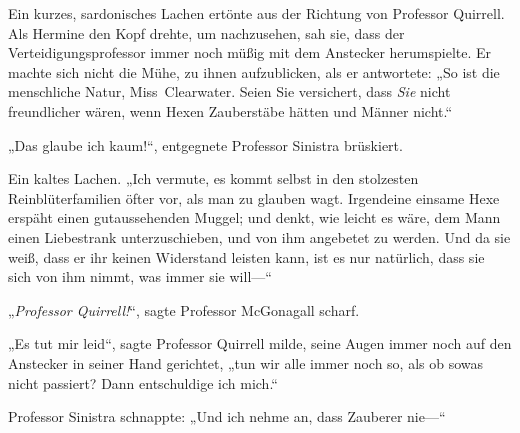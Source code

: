Ein kurzes, sardonisches Lachen ertönte aus der Richtung von Professor Quirrell. Als Hermine den Kopf drehte, um nachzusehen, sah sie, dass der Verteidigungsprofessor immer noch müßig mit dem Anstecker herumspielte. Er machte sich nicht die Mühe, zu ihnen aufzublicken, als er antwortete: „So ist die menschliche Natur, Miss~Clearwater. Seien Sie versichert, dass \emph{Sie} nicht freundlicher wären, wenn Hexen Zauberstäbe hätten und Männer nicht.“

„Das glaube ich kaum!“, entgegnete Professor Sinistra brüskiert.

Ein kaltes Lachen. „Ich vermute, es kommt selbst in den stolzesten Reinblüterfamilien öfter vor, als man zu glauben wagt. Irgendeine einsame Hexe erspäht einen gutaussehenden Muggel; und denkt, wie leicht es wäre, dem Mann einen Liebestrank unterzuschieben, und von ihm angebetet zu werden. Und da sie weiß, dass er ihr keinen Widerstand leisten kann, ist es nur natürlich, dass sie sich von ihm nimmt, was immer sie will—“

„\emph{Professor Quirrell!}“, sagte Professor McGonagall scharf.

„Es tut mir leid“, sagte Professor Quirrell milde, seine Augen immer noch auf den Anstecker in seiner Hand gerichtet, „tun wir alle immer noch so, als ob sowas nicht passiert? Dann entschuldige ich mich.“

Professor Sinistra schnappte: „Und ich nehme an, dass Zauberer nie—“


